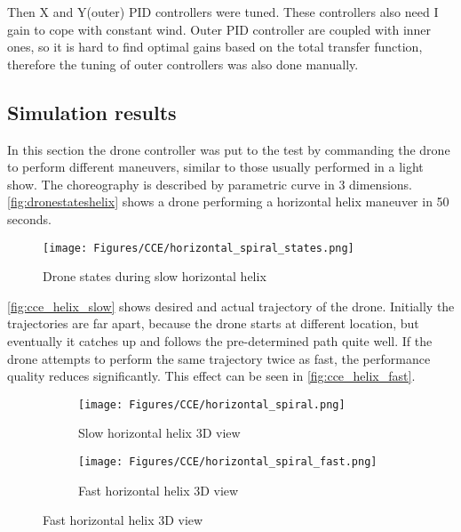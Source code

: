 Then X and Y(outer) PID controllers were tuned. These controllers also need I gain to cope with constant wind. Outer PID controller are coupled with inner ones, so it is hard to find optimal gains based on the total transfer function, therefore the tuning of outer controllers was also done manually. 


\subsection{Simulation results}
In this section the drone controller was put to the test by commanding the drone to perform different maneuvers, similar to those usually performed in a light show. The choreography is described by parametric curve in 3 dimensions. 
\autoref{fig:dronestateshelix} shows a drone performing a horizontal helix maneuver in 50 seconds. 
\begin{figure}[H]
\label{fig:dronestateshelix}
    \centering
    \texttt{[image: Figures/CCE/horizontal\_spiral\_states.png]}
    \caption{Drone states during slow horizontal helix }
    \label{fig:cce_helix_states}
\end{figure}
 \autoref{fig:cce_helix_slow} shows desired and actual trajectory of the drone. Initially the trajectories are far apart, because the drone starts at different location, but eventually it catches up and follows the pre-determined path quite well. If the drone attempts to perform the same trajectory twice as fast, the performance quality reduces significantly. This effect can be seen in \autoref{fig:cce_helix_fast}.


\begin{figure}[H]
     \centering
     \begin{subfigure}[b]{0.45\textwidth}
         \centering
         \texttt{[image: Figures/CCE/horizontal\_spiral.png]}
         \caption{Slow horizontal helix 3D view }
         \label{fig:cce_helix_slow}
     \end{subfigure}
     \hfill
     \begin{subfigure}[b]{0.45\textwidth}
         \centering
         \texttt{[image: Figures/CCE/horizontal\_spiral\_fast.png]}
         \caption{Fast horizontal helix 3D view}
         \label{fig:cce_helix_fast}
     \end{subfigure}

\end{figure}

